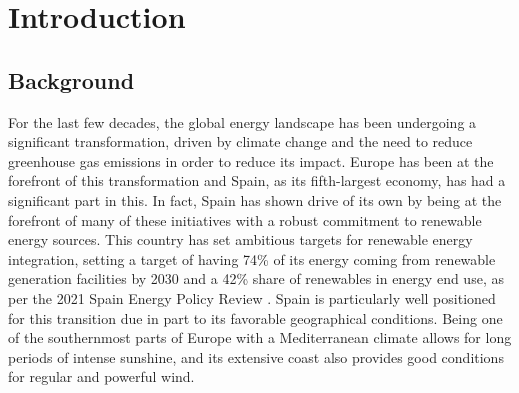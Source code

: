 \section{Introduction}
\subsection{Background}

For the last few decades, the global energy landscape has been undergoing a significant transformation, driven by climate change and the need to reduce greenhouse gas emissions in order to reduce its impact. Europe has been at the forefront of this transformation and Spain, as its fifth-largest economy, has had a significant part in this. In fact, Spain has shown drive of its own by being at the forefront of many of these initiatives with a robust commitment to renewable energy sources. This country has set ambitious targets for renewable energy integration, setting a target of having 74\% of its energy coming from renewable generation facilities by 2030 and a 42\% share of renewables in energy end use, as per the 2021 Spain Energy Policy Review \cite{energy_policy_review_spain_2021}. Spain is particularly well positioned for this transition due in part to its favorable geographical conditions. Being one of the southernmost parts of Europe with a Mediterranean climate allows for long periods of intense sunshine, and its extensive coast also provides good conditions for regular and powerful wind. 

